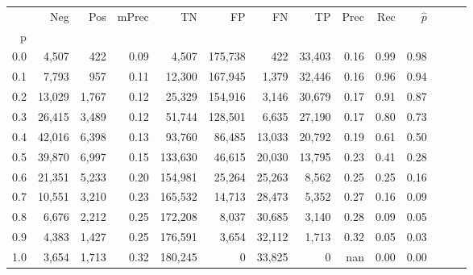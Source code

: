 \begin{tabular}{rrrrrrrrrrrrrr}
\toprule
{} &     Neg &    Pos & mPrec &       TN &       FP &      FN &      TP &  Prec &   Rec & $\hat{p}$ \\
p   &         &        &       &          &          &         &         &       &       &           \\
\midrule
0.0 &   4,507 &    422 &  0.09 &    4,507 &  175,738 &     422 &  33,403 &  0.16 &  0.99 &      0.98 \\
0.1 &   7,793 &    957 &  0.11 &   12,300 &  167,945 &   1,379 &  32,446 &  0.16 &  0.96 &      0.94 \\
0.2 &  13,029 &  1,767 &  0.12 &   25,329 &  154,916 &   3,146 &  30,679 &  0.17 &  0.91 &      0.87 \\
0.3 &  26,415 &  3,489 &  0.12 &   51,744 &  128,501 &   6,635 &  27,190 &  0.17 &  0.80 &      0.73 \\
0.4 &  42,016 &  6,398 &  0.13 &   93,760 &   86,485 &  13,033 &  20,792 &  0.19 &  0.61 &      0.50 \\
0.5 &  39,870 &  6,997 &  0.15 &  133,630 &   46,615 &  20,030 &  13,795 &  0.23 &  0.41 &      0.28 \\
0.6 &  21,351 &  5,233 &  0.20 &  154,981 &   25,264 &  25,263 &   8,562 &  0.25 &  0.25 &      0.16 \\
0.7 &  10,551 &  3,210 &  0.23 &  165,532 &   14,713 &  28,473 &   5,352 &  0.27 &  0.16 &      0.09 \\
0.8 &   6,676 &  2,212 &  0.25 &  172,208 &    8,037 &  30,685 &   3,140 &  0.28 &  0.09 &      0.05 \\
0.9 &   4,383 &  1,427 &  0.25 &  176,591 &    3,654 &  32,112 &   1,713 &  0.32 &  0.05 &      0.03 \\
1.0 &   3,654 &  1,713 &  0.32 &  180,245 &        0 &  33,825 &       0 &   nan &  0.00 &      0.00 \\
\bottomrule
\end{tabular}
